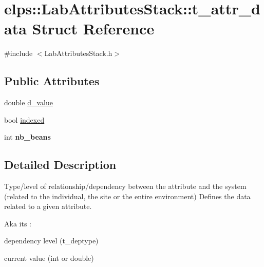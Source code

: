 \hypertarget{structelps_1_1_lab_attributes_stack_1_1t__attr__data}{\section{elps\-:\-:Lab\-Attributes\-Stack\-:\-:t\-\_\-attr\-\_\-data Struct Reference}
\label{structelps_1_1_lab_attributes_stack_1_1t__attr__data}
}


{\ttfamily \#include $<$Lab\-Attributes\-Stack.\-h$>$}

\subsection*{Public Attributes}
\begin{DoxyCompactItemize}
\item 
double \hyperlink{structelps_1_1_lab_attributes_stack_1_1t__attr__data_a19980f86ba84b14f9cdddca2b041d754}{d\-\_\-value}
\item 
bool \hyperlink{structelps_1_1_lab_attributes_stack_1_1t__attr__data_aa85d8c64cdfc9b5e62e64903efa96d7b}{indexed}
\item 
\hypertarget{structelps_1_1_lab_attributes_stack_1_1t__attr__data_a377207e3a4a02070961f47ffadecbee7}{int {\bfseries nb\-\_\-beans}}\label{structelps_1_1_lab_attributes_stack_1_1t__attr__data_a377207e3a4a02070961f47ffadecbee7}

\end{DoxyCompactItemize}


\subsection{Detailed Description}
Type/level of relationship/dependency between the attribute and the system (related to the individual, the site or the entire environment) Defines the data related to a given attribute.\par
 Aka its \-:
\begin{DoxyItemize}
\item dependency level (t\-\_\-deptype)
\item current value (int or double) 
\end{DoxyItemize}

